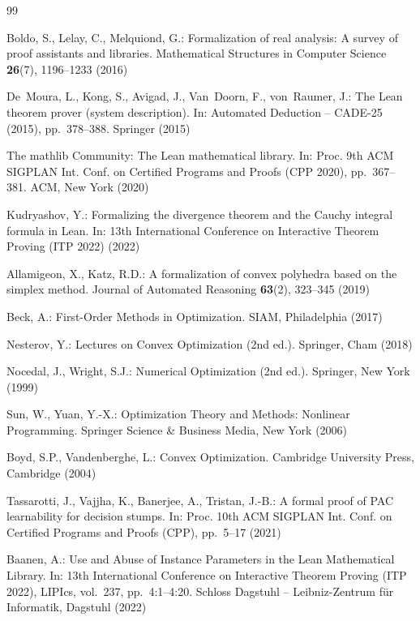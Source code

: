 \documentclass[sn-mathphys]{JORSC-jnl}%
\theoremstyle{thmstyleone}%
\theoremstyle{thmstylethree}%
\begin{document}
\begin{thebibliography}{99}

Boldo, S., Lelay, C., Melquiond, G.:
Formalization of real analysis: A survey of proof assistants and libraries.
Mathematical Structures in Computer Science \textbf{26}(7), 1196--1233 (2016)

De~Moura, L., Kong, S., Avigad, J., Van~Doorn, F., von~Raumer, J.:
The Lean theorem prover (system description).
In: Automated Deduction -- CADE-25 (2015), pp.~378--388. Springer (2015)

The mathlib Community:
The Lean mathematical library.
In: Proc. 9th ACM SIGPLAN Int. Conf. on Certified Programs and Proofs (CPP 2020),
pp.~367--381. ACM, New York (2020)

Kudryashov, Y.:
Formalizing the divergence theorem and the Cauchy integral formula in Lean.
In: 13th International Conference on Interactive Theorem Proving (ITP 2022) (2022)

Allamigeon, X., Katz, R.D.:
A formalization of convex polyhedra based on the simplex method.
Journal of Automated Reasoning \textbf{63}(2), 323--345 (2019)

Beck, A.:
First-Order Methods in Optimization.
SIAM, Philadelphia (2017)

Nesterov, Y.:
Lectures on Convex Optimization (2nd ed.).
Springer, Cham (2018)

Nocedal, J., Wright, S.J.:
Numerical Optimization (2nd ed.).
Springer, New York (1999)

Sun, W., Yuan, Y.-X.:
Optimization Theory and Methods: Nonlinear Programming.
Springer Science \& Business Media, New York (2006)

Boyd, S.P., Vandenberghe, L.:
Convex Optimization.
Cambridge University Press, Cambridge (2004)

Tassarotti, J., Vajjha, K., Banerjee, A., Tristan, J.-B.:
A formal proof of PAC learnability for decision stumps.
In: Proc. 10th ACM SIGPLAN Int. Conf. on Certified Programs and Proofs (CPP),
pp.~5--17 (2021)

Baanen, A.:
Use and Abuse of Instance Parameters in the Lean Mathematical Library.
In: 13th International Conference on Interactive Theorem Proving (ITP 2022),
LIPIcs, vol.~237, pp.~4:1--4:20.
Schloss Dagstuhl -- Leibniz-Zentrum f{\"u}r Informatik, Dagstuhl (2022)


\end{thebibliography}
\end{document}
